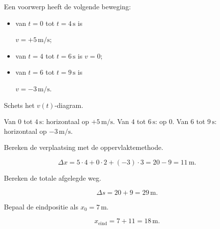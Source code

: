 \documentclass{ximera}
\begin{document}
\begin{oefening}{\oefB\ESS}

Een voorwerp heeft de volgende beweging:

\begin{itemize}

 \item van $t=0$ tot $t=4\,\mathrm{s}$ is

    $v=+5\,\mathrm{m/s}$;

 \item van $t=4$ tot $t=6\,\mathrm{s}$ is $v=0$;

 \item van $t=6$ tot $t=9\,\mathrm{s}$ is

    $v=-3\,\mathrm{m/s}$.

\end{itemize}

\begin{question}

Schets het $v(t)$-diagram.

\begin{oplossing}
Van \(0\) tot \(4\,\mathrm{s}\): horizontaal op \(+5\,\mathrm{m/s}\). Van \(4\) tot \(6\,\mathrm{s}\): op \(0\). Van \(6\) tot \(9\,\mathrm{s}\): horizontaal op \(-3\,\mathrm{m/s}\).
\end{oplossing}

\end{question}

\begin{question}

Bereken de verplaatsing met de oppervlaktemethode.

\begin{oplossing}
\[\Delta x=5\cdot4+0\cdot2+(-3)\cdot3=20-9=11\,\mathrm{m}.\]
\end{oplossing}

\end{question}

\begin{question}

Bereken de totale afgelegde weg.

\begin{oplossing}
\[\Delta s=20+9=29\,\mathrm{m}.\]
\end{oplossing}

\end{question}

\begin{question}

Bepaal de eindpositie als $x_0=7\,\mathrm{m}$.

\begin{oplossing}
\[x_{\mathrm{eind}}=7+11=18\,\mathrm{m}.\]
\end{oplossing}

\end{question}

\end{oefening}
\end{document}
